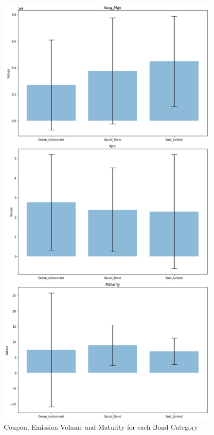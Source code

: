 \documentclass[12pt, a4paper]{article}
\begin{document}
\begin{figure}[H]
    \centering
    \includegraphics[width=0.8\linewidth, height=0.8\textheight, keepaspectratio]{Metrics_per_Bond.png}
    \caption{Coupon, Emission Volume and Maturity for each Bond Category}
\label{fig:Metrics}
\end{figure}
\end{document}
